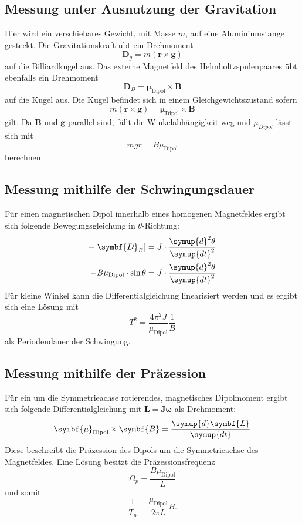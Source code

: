 \subsection{Messung unter Ausnutzung der Gravitation}
Hier wird ein verschiebares Gewicht, mit Masse $m$, auf eine Aluminiumstange gesteckt.
Die Gravitationskraft übt ein Drehmoment
\begin{equation}
  \symbf{D}_g = m (\symbf{r} \times \symbf{g})
\end{equation}
auf die Billiardkugel aus.
Das externe Magnetfeld des Helmholtzspulenpaares übt ebenfalls ein Drehmoment
\begin{equation}
  \symbf{D}_B = \symbf{\mu}_\text{Dipol} \times \symbf{B}
\end{equation}
auf die Kugel aus.
Die Kugel befindet sich in einem Gleichgewichtszustand sofern
\begin{equation}
    m (\symbf{r} \times \symbf{g}) = \symbf{\mu}_\text{Dipol} \times \symbf{B}
\end{equation}
 gilt.
 Da $\symbf{B}$ und $\symbf{g}$ parallel sind, fällt die Winkelabhängigkeit weg und $\mu_{Dipol}$ lässt sich mit
 \begin{equation}
   mgr = B\mu_\text{Dipol}
 \end{equation}
 berechnen.
%
\subsection{Messung mithilfe der Schwingungsdauer}
Für einen magnetischen Dipol innerhalb eines homogenen Magnetfeldes ergibt sich folgende Bewegungsgleichung in
$\theta$-Richtung:
\begin{align}
    -\lvert\symbf{D}_B\rvert &= J \cdot \frac{\symup{d}^2\theta}{\symup{dt}^2} \notag \\
    -B\mu_\text{Dipol}\cdot \sin{\theta} &= J \cdot \frac{\symup{d}^2\theta}{\symup{dt}^2}
\end{align}
Für kleine Winkel kann die Differentialgleichung linearisiert werden und es ergibt sich eine Lösung mit
\begin{equation}
  \label{eq:schwing}
    T^2 = \frac{4\pi^2J}{\mu_\text{Dipol}}\frac{1}{B}
\end{equation}
als Periodendauer der Schwingung.
%
\subsection{Messung mithilfe der Präzession}
Für ein um die Symmetrieachse rotierendes, magnetisches Dipolmoment ergibt sich folgende Differentialgleichung mit
\mbox{$\symbf{L}=\symbf{J\omega}$} als Drehmoment:
\begin{equation}
    \symbf{\mu}_\text{Dipol} \times \symbf{B} = \frac{\symup{d}\symbf{L}}{\symup{dt}}
\end{equation}
Diese beschreibt die Präzession des Dipols um die Symmetrieachse des Magnetfeldes.
Eine Lösung besitzt die Präzessionsfrequenz
\begin{equation}
    \Omega_p = \frac{B\mu_\text{Dipol}}{L}
\end{equation}
und somit
\begin{equation}
  \label{eq:praes}
    \frac{1}{T_p} = \frac{\mu_\text{Dipol}}{2\pi L}B .
\end{equation}
